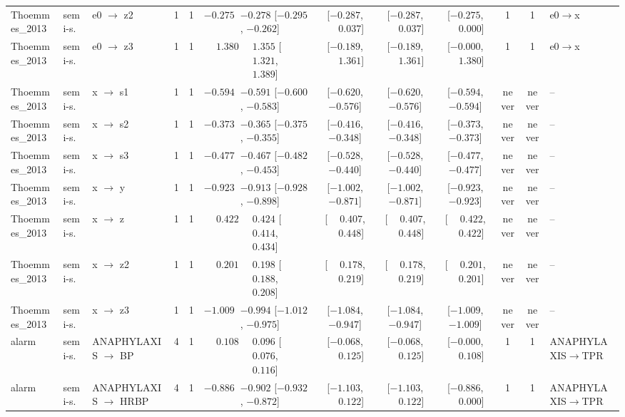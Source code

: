 \begin{landscape}
\begin{longtable}{@{}llp{2.15cm}ccrl cccc c l@{}}
Thoemmes\_2013 & semi-s. & e0 $\to$ z2 & 1 & 1 & $-0.275$ & $-0.278$ [$-0.295$, $-0.262$] & [$-0.287$, $\phantom{-}0.037$] & [$-0.287$, $\phantom{-}0.037$] & [$-0.275$, $\phantom{-}0.000$] & 1 & 1 & e0$\to$x \\
Thoemmes\_2013 & semi-s. & e0 $\to$ z3 & 1 & 1 & $\phantom{-}1.380$ & $\phantom{-}1.355$ [$\phantom{-}1.321$, $\phantom{-}1.389$] & [$-0.189$, $\phantom{-}1.361$] & [$-0.189$, $\phantom{-}1.361$] & [$-0.000$, $\phantom{-}1.380$] & 1 & 1 & e0$\to$x \\
Thoemmes\_2013 & semi-s. & x $\to$ s1 & 1 & 1 & $-0.594$ & $-0.591$ [$-0.600$, $-0.583$] & [$-0.620$, $-0.576$] & [$-0.620$, $-0.576$] & [$-0.594$, $-0.594$] & never & never & -- \\
Thoemmes\_2013 & semi-s. & x $\to$ s2 & 1 & 1 & $-0.373$ & $-0.365$ [$-0.375$, $-0.355$] & [$-0.416$, $-0.348$] & [$-0.416$, $-0.348$] & [$-0.373$, $-0.373$] & never & never & -- \\
Thoemmes\_2013 & semi-s. & x $\to$ s3 & 1 & 1 & $-0.477$ & $-0.467$ [$-0.482$, $-0.453$] & [$-0.528$, $-0.440$] & [$-0.528$, $-0.440$] & [$-0.477$, $-0.477$] & never & never & -- \\
Thoemmes\_2013 & semi-s. & x $\to$ y & 1 & 1 & $-0.923$ & $-0.913$ [$-0.928$, $-0.898$] & [$-1.002$, $-0.871$] & [$-1.002$, $-0.871$] & [$-0.923$, $-0.923$] & never & never & -- \\
Thoemmes\_2013 & semi-s. & x $\to$ z & 1 & 1 & $\phantom{-}0.422$ & $\phantom{-}0.424$ [$\phantom{-}0.414$, $\phantom{-}0.434$] & [$\phantom{-}0.407$, $\phantom{-}0.448$] & [$\phantom{-}0.407$, $\phantom{-}0.448$] & [$\phantom{-}0.422$, $\phantom{-}0.422$] & never & never & -- \\
Thoemmes\_2013 & semi-s. & x $\to$ z2 & 1 & 1 & $\phantom{-}0.201$ & $\phantom{-}0.198$ [$\phantom{-}0.188$, $\phantom{-}0.208$] & [$\phantom{-}0.178$, $\phantom{-}0.219$] & [$\phantom{-}0.178$, $\phantom{-}0.219$] & [$\phantom{-}0.201$, $\phantom{-}0.201$] & never & never & -- \\
Thoemmes\_2013 & semi-s. & x $\to$ z3 & 1 & 1 & $-1.009$ & $-0.994$ [$-1.012$, $-0.975$] & [$-1.084$, $-0.947$] & [$-1.084$, $-0.947$] & [$-1.009$, $-1.009$] & never & never & -- \\
alarm & semi-s. & ANAPHYLAXIS $\to$ BP & 4 & 1 & $\phantom{-}0.108$ & $\phantom{-}0.096$ [$\phantom{-}0.076$, $\phantom{-}0.116$] & [$-0.068$, $\phantom{-}0.125$] & [$-0.068$, $\phantom{-}0.125$] & [$-0.000$, $\phantom{-}0.108$] & 1 & 1 & ANAPHYLAXIS$\to$TPR \\
alarm & semi-s. & ANAPHYLAXIS $\to$ HRBP & 4 & 1 & $-0.886$ & $-0.902$ [$-0.932$, $-0.872$] & [$-1.103$, $\phantom{-}0.122$] & [$-1.103$, $\phantom{-}0.122$] & [$-0.886$, $\phantom{-}0.000$] & 1 & 1 & ANAPHYLAXIS$\to$TPR \\

\end{longtable}
\end{landscape}
